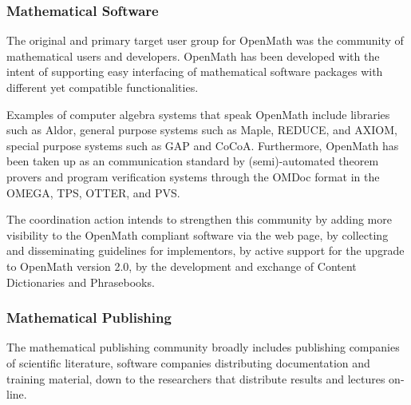 \documentclass{euproposal}
\begin{document}



\subsubsection{Mathematical Software}\label{sec:msw}

The original and primary target user group for OpenMath was the
community of mathematical users and developers. OpenMath has been
developed with the intent of supporting easy interfacing of
mathematical software packages with different yet compatible
functionalities.

Examples of computer algebra systems that speak OpenMath include
libraries such as Aldor, general purpose systems such as Maple,
REDUCE, and AXIOM, special purpose systems such as GAP and CoCoA.
Furthermore, OpenMath has been taken up as an communication standard
by (semi)-automated theorem provers and program verification systems
through the OMDoc format in the OMEGA, TPS, OTTER, and PVS.

The coordination action intends to strengthen this community by adding
more visibility to the OpenMath compliant software via the web page,
by collecting and disseminating guidelines for implementors, by active
support for the upgrade to OpenMath version 2.0, by the development
and exchange of Content Dictionaries and Phrasebooks.

\subsubsection{Mathematical Publishing}\label{sec:mpubl}

The mathematical publishing community broadly includes publishing
companies of scientific literature, software companies distributing
documentation and training material, down to the researchers that
distribute results and lectures on-line.
\end{document}
